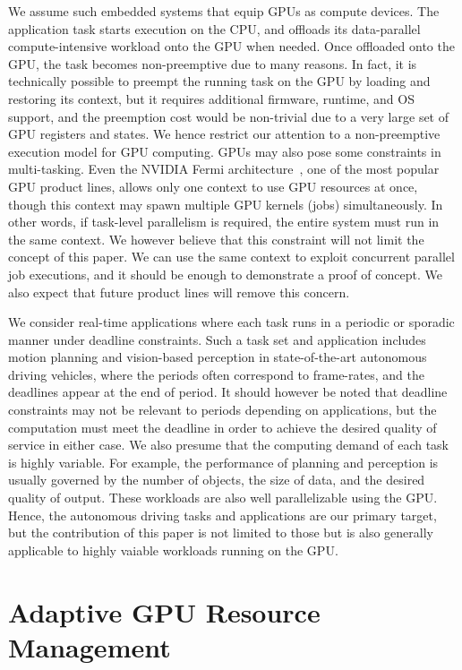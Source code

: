\documentclass[times, 10pt, twocolumn]{article}
\begin{document}
We assume such embedded systems that equip GPUs as compute devices.
The application task starts execution on the CPU, and offloads its
data-parallel compute-intensive workload onto the GPU when needed.
Once offloaded onto the GPU, the task becomes non-preemptive due to many
reasons.
In fact, it is technically possible to preempt the running task on the
GPU by loading and restoring its context, but it requires additional
firmware, runtime, and OS support, and the preemption cost would be
non-trivial due to a very large set of GPU registers and states.
We hence restrict our attention to a non-preemptive execution model for
GPU computing.
GPUs may also pose some constraints in multi-tasking.
Even the NVIDIA Fermi architecture~\cite{Fermi}, one of the most popular
GPU product lines, allows only one context to use GPU resources at
once, though this context may spawn multiple GPU kernels (jobs)
simultaneously.
In other words, if task-level parallelism is required, the entire system
must run in the same context.
We however believe that this constraint will not limit the concept of
this paper.
We can use the same context to exploit concurrent parallel job
executions, and it should be enough to demonstrate a proof of concept. 
We also expect that future product lines will remove this concern.

We consider real-time applications where each task runs in a periodic or
sporadic manner under deadline constraints.
Such a task set and application includes motion planning and 
vision-based perception in state-of-the-art autonomous driving
vehicles, where the periods often correspond to frame-rates, and the
deadlines appear at the end of period.
It should however be noted that deadline constraints may not be relevant
to periods depending on applications, but the computation must meet the
deadline in order to achieve the desired quality of service in either case.
We also presume that the computing demand of each task is highly
variable.
For example, the performance of planning and perception is usually
governed by the number of objects, the size of data, and the desired
quality of output.
These workloads are also well parallelizable using the GPU.
Hence, the autonomous driving tasks and applications are our primary
target, but the contribution of this paper is not limited to those but
is also generally applicable to highly vaiable workloads running on the
GPU.

\section{Adaptive GPU Resource Management}
\label{sec:adaptivity_support}
\end{document}
